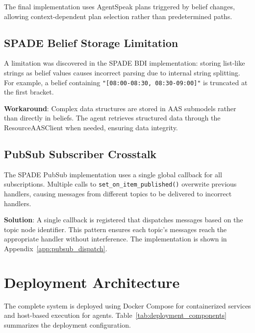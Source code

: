 The final implementation uses AgentSpeak plans triggered by belief changes, allowing context-dependent plan selection rather than predetermined paths.

\subsection{SPADE Belief Storage Limitation}

A limitation was discovered in the SPADE \ac{BDI} implementation: storing list-like strings as belief values causes incorrect parsing due to internal string splitting. For example, a belief containing \texttt{"[08:00-08:30, 08:30-09:00]"} is truncated at the first bracket.

\textbf{Workaround}: Complex data structures are stored in \ac{AAS} submodels rather than directly in beliefs. The agent retrieves structured data through the ResourceAASClient when needed, ensuring data integrity.

\subsection{PubSub Subscriber Crosstalk}

The SPADE PubSub implementation uses a single global callback for all subscriptions. Multiple calls to \texttt{set\_on\_item\_published()} overwrite previous handlers, causing messages from different topics to be delivered to incorrect handlers.

\textbf{Solution}: A single callback is registered that dispatches messages based on the topic node identifier. This pattern ensures each topic's messages reach the appropriate handler without interference. The implementation is shown in Appendix~\ref{app:pubsub_dispatch}.

\section{Deployment Architecture}
\label{sec:deployment}

The complete system is deployed using Docker Compose for containerized services and host-based execution for agents. Table~\ref{tab:deployment_components} summarizes the deployment configuration.


